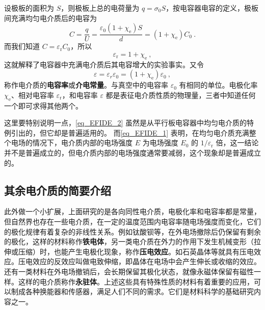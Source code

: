 设极板的面积为 $S$，则极板上总的电荷量为 $q=\sigma_{0} S$，按电容器电容的定义，极板间充满均匀电介质后的电容为
\begin{equation}
C=\frac{q}{U}=\frac{\varepsilon_{0}\left(1+\chi_{\mathrm e}\right) S}{d}=\left(1+\chi_{\mathrm e}\right) C_{0}~.
\end{equation}
而我们知道 $C=\varepsilon_\mathrm{r}C_0$，所以
\begin{equation} \label{eq_EFIDE_2}
\varepsilon_{\mathrm{r}}=1+\chi_{\mathrm{e}}~,
\end{equation}
这就解释了电容器中充满电介质后其电容增大的实验事实。又令
\begin{equation}
\varepsilon=\varepsilon_{r} \varepsilon_{0}=\left(1+\chi_{\mathrm{e}}\right) \varepsilon_{0}~,
\end{equation}
称作电介质的\textbf{电容率}或\textbf{介电常量}。与真空中的电容率 $\varepsilon_0$ 有相同的单位。电极化率 $\chi_{\mathrm{e}}$、相对电容率 $\varepsilon_\mathrm{r}$，和电容率 $\varepsilon$ 都是表征电介质性质的物理量，三者中知道任何一个即可求得其他两个。

这里要特别说明一点，\autoref{eq_EFIDE_2} 虽然是从平行板电容器中均匀电介质的特例引出的，但它却是普遍适用的。
而\autoref{eq_EFIDE_1} 表明，在均匀电介质充满整个电场的情况下，电介质内部的电场强度 $E $ 为电场强度 $E_0$ 的 $1/\varepsilon_{\mathrm{r}}$ 倍，这一结论并不是普遍成立的，但电介质内部的电场强度通常要减弱，这个现象却是普遍成立的。

\subsection{其余电介质的简要介绍}
此外做一个小扩展，上面研究的是各向同性电介质，电极化率和电容率都是常量，但自然界也存在一些电介质，在一定的温度范围内电容率随电场强度而变化，它们的极化规律有着复杂的非线性关系。例如钛酸钡等，在外电场撤除后仍保留有剩余的极化，这样的材料称作\textbf{铁电体}，另一类电介质在外力的作用下发生机械变形（拉伸或压缩）时，也能产生电极化现象，称作\textbf{压电效应}。如石英晶体等就具有压电效应。压电效应的反效应叫做电致伸缩，即晶体在电场中会产生伸长或收缩的效应。还有一类材料在外电场撤销后，会长期保留其极化状态，就像永磁体保留有磁性一样。这样的电介质称作\textbf{永驻体}。上述这些具有特殊性质的材料有着重要的应用，可以制成各种换能器和传感器，满足人们不同的需求。它们是材料科学的基础研究内容之一。

